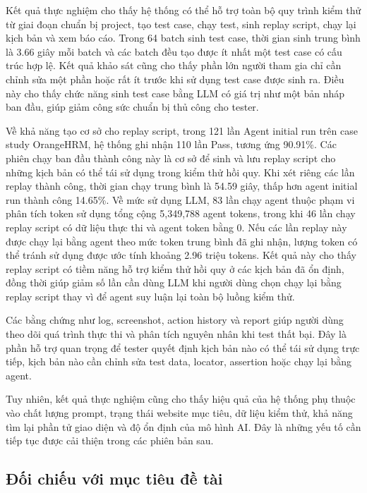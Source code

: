 Kết quả thực nghiệm cho thấy hệ thống có thể hỗ trợ toàn bộ quy trình kiểm thử từ giai đoạn chuẩn bị project, tạo test case, chạy test, sinh replay script, chạy lại kịch bản và xem báo cáo. Trong 64 batch sinh test case, thời gian sinh trung bình là 3.66 giây mỗi batch và các batch đều tạo được ít nhất một test case có cấu trúc hợp lệ. Kết quả khảo sát cũng cho thấy phần lớn người tham gia chỉ cần chỉnh sửa một phần hoặc rất ít trước khi sử dụng test case được sinh ra. Điều này cho thấy chức năng sinh test case bằng LLM có giá trị như một bản nháp ban đầu, giúp giảm công sức chuẩn bị thủ công cho tester.

Về khả năng tạo cơ sở cho replay script, trong 121 lần Agent initial run trên case study OrangeHRM, hệ thống ghi nhận 110 lần Pass, tương ứng 90.91\%. Các phiên chạy ban đầu thành công này là cơ sở để sinh và lưu replay script cho những kịch bản có thể tái sử dụng trong kiểm thử hồi quy. Khi xét riêng các lần replay thành công, thời gian chạy trung bình là 54.59 giây, thấp hơn agent initial run thành công 14.65\%. Về mức sử dụng LLM, 83 lần chạy agent thuộc phạm vi phân tích token sử dụng tổng cộng 5,349,788 agent tokens, trong khi 46 lần chạy replay script có dữ liệu thực thi và agent token bằng 0. Nếu các lần replay này được chạy lại bằng agent theo mức token trung bình đã ghi nhận, lượng token có thể tránh sử dụng được ước tính khoảng 2.96 triệu tokens. Kết quả này cho thấy replay script có tiềm năng hỗ trợ kiểm thử hồi quy ở các kịch bản đã ổn định, đồng thời giúp giảm số lần cần dùng LLM khi người dùng chọn chạy lại bằng replay script thay vì để agent suy luận lại toàn bộ luồng kiểm thử.

Các bằng chứng như log, screenshot, action history và report giúp người dùng theo dõi quá trình thực thi và phân tích nguyên nhân khi test thất bại. Đây là phần hỗ trợ quan trọng để tester quyết định kịch bản nào có thể tái sử dụng trực tiếp, kịch bản nào cần chỉnh sửa test data, locator, assertion hoặc chạy lại bằng agent.

Tuy nhiên, kết quả thực nghiệm cũng cho thấy hiệu quả của hệ thống phụ thuộc vào chất lượng prompt, trạng thái website mục tiêu, dữ liệu kiểm thử, khả năng tìm lại phần tử giao diện và độ ổn định của mô hình AI. Đây là những yếu tố cần tiếp tục được cải thiện trong các phiên bản sau.

\subsection{Đối chiếu với mục tiêu đề tài}

